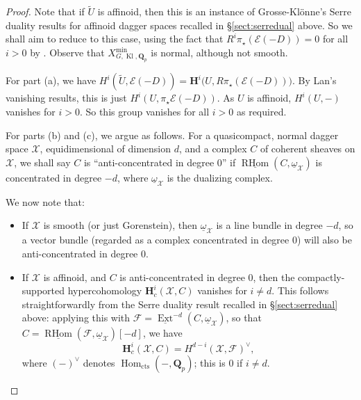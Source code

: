 \documentclass[cjm]{ipart}
\theoremstyle{plain}
\theoremstyle{remark}
\DeclareMathOperator{\Hom}{Hom}
\DeclareMathOperator{\Kl}{Kl}
\newcommand{\HH}{\mathbf{H}}
\newcommand{\QQ}{\mathbf{Q}}
\newcommand{\Qp}{\QQ_p}
\newcommand{\cE}{\mathcal{E}}
\newcommand{\cF}{\mathcal{F}}
\newcommand{\cX}{\mathcal{X}}
\numberwithin{equation}{subsection}
\begin{document}
  \begin{proof}
   Note that if $\tilde U$ is affinoid, then this is an instance of Grosse-Kl\"onne's Serre duality results for affinoid dagger spaces recalled in \S\ref{sect:serredual} above. So we shall aim to reduce to this case, using the fact that $R^i\pi_\star\left(\cE(-D)\right)= 0$ for all $i > 0$ by \cite[Theorem 8.6]{lan17}. Observe that $X_{G,\Kl,\Qp}^{\mathrm{min}}$ is normal, although not smooth.

   For part (a), we have $H^i(\tilde U, \cE(-D)) = \HH^i\big(U, R\pi_ \star\left(\cE(-D)\right)\big)$. By Lan's vanishing results, this is just $H^i(U, \pi_\star \cE(-D))$. As $U$ is affinoid, $H^i(U, -)$ vanishes for $i > 0$. So this group vanishes for all $i > 0$ as required.

   For parts (b) and (c), we argue as follows. For a quasicompact, normal dagger space $\cX$, equidimensional of dimension $d$, and a complex $C$ of coherent sheaves on $\cX$, we shall say $C$ is ``anti-concentrated in degree $0$'' if $\underline{\operatorname{RHom}}(C, \underline{\omega}_\cX)$ is concentrated in degree $-d$, where $\underline{\omega}_\cX$ is the dualizing complex.

   We now note that:
   \begin{itemize}
   \item If $\cX$ is smooth (or just Gorenstein), then $\underline{\omega}_\cX$ is a line bundle in degree $-d$, so a vector bundle (regarded as a complex concentrated in degree 0) will also be anti-concentrated in degree 0.

   \item If $\cX$ is affinoid, and $C$ is anti-concentrated in degree $0$, then the compactly-supported hypercohomology $\HH^i_c(\cX, C)$ vanishes for $i \ne d$. This follows straightforwardly from the Serre duality result recalled in \S\ref{sect:serredual} above: applying this with $\cF = \underline{\operatorname{Ext}}^{-d}(C, \underline{\omega}_\cX)$, so that $C = \underline{\operatorname{RHom}}(\cF, \underline{\omega}_{\cX})[-d]$, we have
   \begin{equation}\label{eq:serredual1}
   \HH^i_c(\cX, C) = H^{d-i}\left(\cX,\cF\right)^\vee,
   \end{equation}
   where $(-)^\vee$ denotes $\Hom_{\mathrm{cts}}(-, \Qp)$; this is 0 if $i \ne d$.



\end{itemize}
\end{proof}
\end{document}
